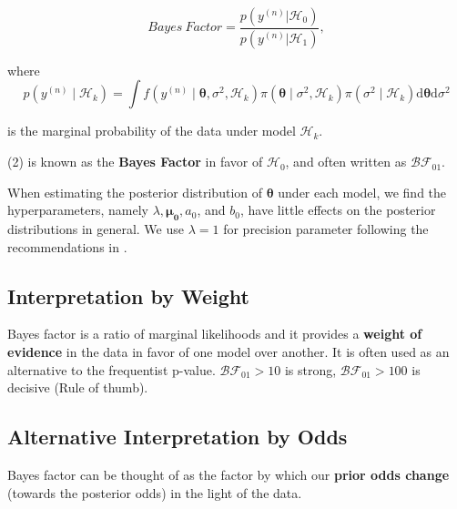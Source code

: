\documentclass[11pt]{article}
\begin{document}
\begin{equation}
    Bayes \: Factor = \frac{p(y^{(n)}| \mathcal{H}_0)}{p(y^{(n)}| \mathcal{H}_1)},
\end{equation}

where \begin{equation}
    p\left(y^{(n)} \mid \mathcal{H}_{k}\right)=\int f\left(y^{(n)} \mid \boldsymbol{\theta}, \sigma^{2}, \mathcal{H}_{k}\right) \pi\left(\boldsymbol{\theta} \mid \sigma^{2},\mathcal{H}_{k}\right) \pi\left(\sigma^{2} \mid \mathcal{H}_{k}\right) \mathrm{d} \boldsymbol{\theta} \mathrm{d} \sigma^{2}
\end{equation} 

is the marginal probability of the data under model $\mathcal{H}_{k}$. \cite{10.1093/biostatistics/kxy049} 

(2) is known as the \textbf{Bayes Factor} in favor of $\mathcal{H}_0$, and often written as $\mathcal{B}\mathcal{F}_{01}$.

When estimating the posterior distribution of $\boldsymbol{\theta}$ under each model, we find the hyperparameters, namely $\lambda, \boldsymbol{\mu}_{\mathbf{0}}, a_{0}$, and $b_{0}$, have little effects on the posterior distributions in general. We use $\lambda=1$ for precision parameter following the recommendations in \cite{doi:10.1080/01621459.1995.10476572}. 

\subsection{Interpretation by Weight}

Bayes factor is a ratio of marginal likelihoods and it provides a \textbf{weight of evidence} in the data in favor of one model over another. It is often used as an alternative to the frequentist p-value. $\mathcal{B}\mathcal{F}_{01} > 10$ is strong, $\mathcal{B}\mathcal{F}_{01} > 100$ is decisive (Rule of thumb).

\subsection{Alternative Interpretation by Odds}

Bayes factor can be thought of as the factor by which our \textbf{prior odds change} (towards the posterior odds) in the light of the data. 
\end{document}
